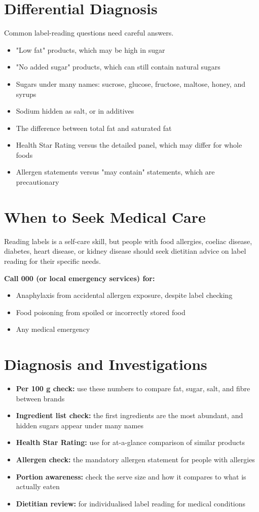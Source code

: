 \section*{Differential Diagnosis}
Common label-reading questions need careful answers.
\begin{itemize}
    \item "Low fat" products, which may be high in sugar
    \item "No added sugar" products, which can still contain natural sugars
    \item Sugars under many names: sucrose, glucose, fructose, maltose, honey, and syrups
    \item Sodium hidden as salt, or in additives
    \item The difference between total fat and saturated fat
    \item Health Star Rating versus the detailed panel, which may differ for whole foods
    \item Allergen statements versus "may contain" statements, which are precautionary
\end{itemize}

\section*{When to Seek Medical Care}
Reading labels is a self-care skill, but people with food allergies, coeliac disease, diabetes, heart disease, or kidney disease should seek dietitian advice on label reading for their specific needs.

\textbf{Call 000 (or local emergency services) for:}
\begin{itemize}
    \item Anaphylaxis from accidental allergen exposure, despite label checking
    \item Food poisoning from spoiled or incorrectly stored food
    \item Any medical emergency
\end{itemize}

\section*{Diagnosis and Investigations}
\begin{itemize}
    \item \textbf{Per 100 g check:} use these numbers to compare fat, sugar, salt, and fibre between brands
    \item \textbf{Ingredient list check:} the first ingredients are the most abundant, and hidden sugars appear under many names
    \item \textbf{Health Star Rating:} use for at-a-glance comparison of similar products
    \item \textbf{Allergen check:} the mandatory allergen statement for people with allergies
    \item \textbf{Portion awareness:} check the serve size and how it compares to what is actually eaten
    \item \textbf{Dietitian review:} for individualised label reading for medical conditions
\end{itemize}

